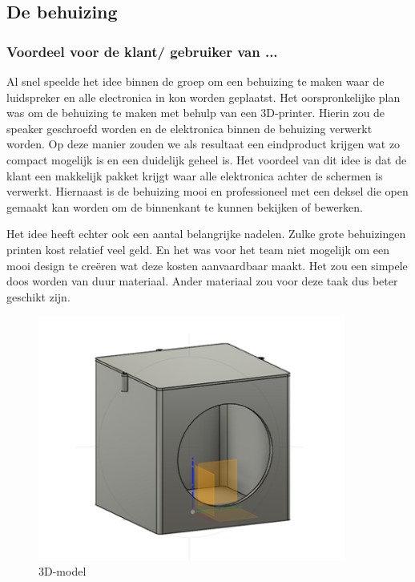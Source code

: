 \subsection{De behuizing}
\subsubsection{Voordeel voor de klant/ gebruiker van ...}
Al snel speelde het idee binnen de groep om een behuizing te maken waar de luidspreker en alle electronica in kon worden geplaatst. Het oorspronkelijke plan was om de behuizing te maken met behulp van een 3D-printer. Hierin zou de speaker geschroefd worden en de elektronica binnen de behuizing verwerkt worden. Op deze manier zouden we als resultaat een eindproduct krijgen wat zo compact mogelijk is en een duidelijk geheel is. 
Het voordeel van dit idee is dat de klant een makkelijk pakket krijgt waar alle elektronica achter de schermen is verwerkt. Hiernaast is de behuizing mooi en professioneel met een deksel die open gemaakt kan worden om de binnenkant te kunnen bekijken of bewerken. 

Het idee heeft echter ook een aantal belangrijke nadelen. Zulke grote behuizingen printen kost relatief veel geld. En het was voor het team niet mogelijk om een mooi design te creëren wat deze kosten aanvaardbaar maakt. Het zou een simpele doos worden van duur materiaal. Ander materiaal zou voor deze taak dus beter geschikt zijn. 
\begin{figure}[ht]
    \centering
    \includegraphics[width=0.90\textwidth]{IMG/004/v4.png}
    \caption{3D-model}
    \label{fig:3D-model}
\end{figure}

